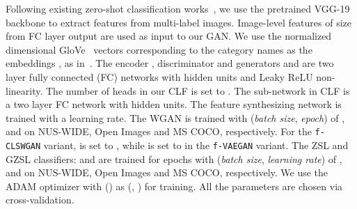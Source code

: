 \documentclass[10pt,journal,compsoc]{IEEEtran}
\newcommand{\clswgan}{\texttt{f-CLSWGAN}}
\newcommand{\vaegan}{\texttt{f-VAEGAN}}
\begin{document}
Following existing zero-shot classification works~\cite{zhang2016fast,huynh2020shared}, we use the pretrained VGG-19 backbone to extract features from multi-label images.
Image-level features of size  from FC layer output are used as input to our GAN. We use the  normalized  dimensional GloVe~\cite{pennington2014glove} vectors corresponding to the category names as the embeddings , as in~\cite{huynh2020shared}. The encoder , discriminator  and generators  and  are two layer fully connected (FC) networks with  hidden units and Leaky ReLU non-linearity. The number of heads  in our CLF is set to . The sub-network  in CLF is a two layer FC network with  hidden units. 
The feature synthesizing network is trained with a  learning rate. The WGAN is trained with (\textit{batch size}, \textit{epoch}) of ,  and  on NUS-WIDE, Open Images and MS COCO, respectively. For the \clswgan{} variant,  is set to , while  is set to  in the \vaegan{} variant. The ZSL and GZSL classifiers:  and  are trained for  epochs with (\textit{batch size}, \textit{learning rate}) of ,  and  on NUS-WIDE, Open Images and MS COCO, respectively. We use the ADAM optimizer with () as (, ) for training.
All the parameters are chosen via cross-validation. 
\end{document}
